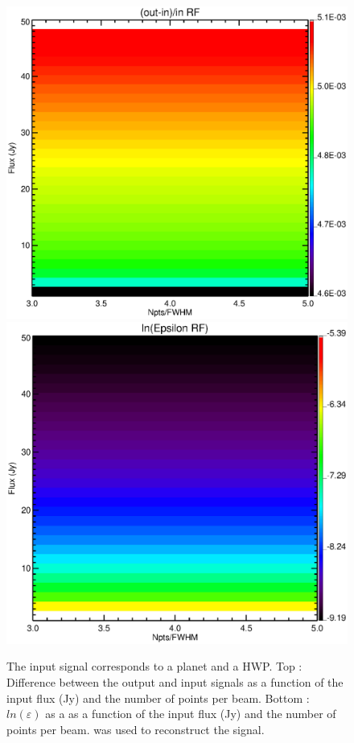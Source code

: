 \begin{figure}[h]
\center
	\includegraphics[scale=0.2]{Figures/diff_rf_planet_hwp.eps}
	\includegraphics[scale=0.2]{Figures/epsilon_rf_planet_hwp.eps}
	\caption{The input signal corresponds to a planet and a HWP. Top : Difference between the output and input signals as a function of the input flux (Jy) and the number of points per beam. Bottom : $ln(\varepsilon)$ as a as a function of the input flux (Jy) and the number of points per beam. \rf was used to reconstruct the signal.}
	\label{fig:epsilon-rf-planet-hwp}
\end{figure}

